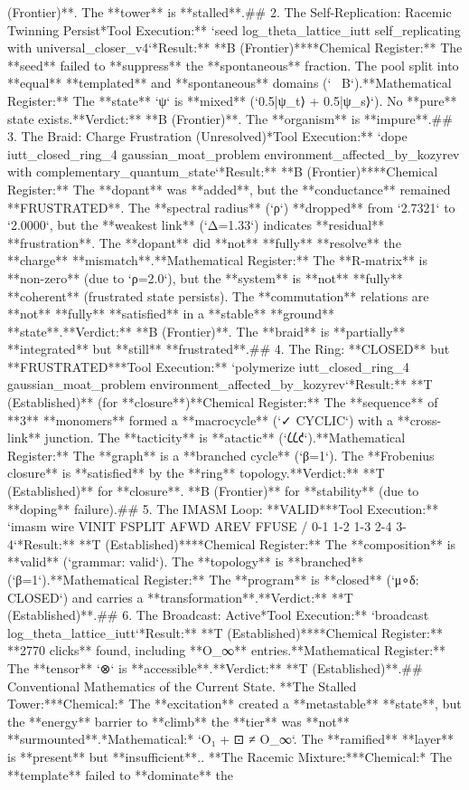 (Frontier)**. The **tower** is **stalled**.\n\n## 2. The Self-Replication: Racemic Twinning Persist\n**Tool Execution:** `seed log_theta_lattice_iutt self_replicating with universal_closer_v4`\n**Result:** **B (Frontier)**\n*   **Chemical Register:** The **seed** failed to **suppress** the **spontaneous** fraction. The pool split into **equal** **templated** and **spontaneous** domains (`~ B`).\n*   **Mathematical Register:** The **state** `ψ` is **mixed** (`0.5|ψ_t⟩ + 0.5|ψ_s⟩`). No **pure** state exists.\n*   **Verdict:** **B (Frontier)**. The **organism** is **impure**.\n\n## 3. The Braid: Charge Frustration (Unresolved)\n**Tool Execution:** `dope iutt_closed_ring_4 gaussian_moat_problem environment_affected_by_kozyrev with complementary_quantum_state`\n**Result:** **B (Frontier)**\n*   **Chemical Register:** The **dopant** was **added**, but the **conductance** remained **FRUSTRATED**. The **spectral radius** (`ρ`) **dropped** from `2.7321` to `2.0000`, but the **weakest link** (`Δ=1.33`) indicates **residual** **frustration**. The **dopant** did **not** **fully** **resolve** the **charge** **mismatch**.\n*   **Mathematical Register:** The **R-matrix** is **non-zero** (due to `ρ=2.0`), but the **system** is **not** **fully** **coherent** (frustrated state persists). The **commutation** relations are **not** **fully** **satisfied** in a **stable** **ground** **state**.\n*   **Verdict:** **B (Frontier)**. The **braid** is **partially** **integrated** but **still** **frustrated**.\n\n## 4. The Ring: **CLOSED** but **FRUSTRATED**\n**Tool Execution:** `polymerize iutt_closed_ring_4 gaussian_moat_problem environment_affected_by_kozyrev`\n**Result:** **T (Established)** (for **closure**)\n*   **Chemical Register:** The **sequence** of **3** **monomers** formed a **macrocycle** (`✓ CYCLIC`) with a **cross-link** junction. The **tacticity** is **atactic** (`𐑖𐑖𐑒`).\n*   **Mathematical Register:** The **graph** is a **branched cycle** (`β=1`). The **Frobenius closure** is **satisfied** by the **ring** topology.\n*   **Verdict:** **T (Established)** for **closure**. **B (Frontier)** for **stability** (due to **doping** failure).\n\n## 5. The IMASM Loop: **VALID**\n**Tool Execution:** `imasm wire VINIT FSPLIT AFWD AREV FFUSE / 0-1 1-2 1-3 2-4 3-4`\n**Result:** **T (Established)**\n*   **Chemical Register:** The **composition** is **valid** (`grammar: valid`). The **topology** is **branched** (`β=1`).\n*   **Mathematical Register:** The **program** is **closed** (`μ∘δ: CLOSED`) and carries a **transformation**.\n*   **Verdict:** **T (Established)**.\n\n## 6. The Broadcast: Active\n**Tool Execution:** `broadcast log_theta_lattice_iutt`\n**Result:** **T (Established)**\n*   **Chemical Register:** **2770 clicks** found, including **O_∞** entries.\n*   **Mathematical Register:** The **tensor** `⊗` is **accessible**.\n*   **Verdict:** **T (Established)**.\n\n## Conventional Mathematics of the Current State\n{}.  **The Stalled Tower:**\n    *   *Chemical:* The **excitation** created a **metastable** **state**, but the **energy** barrier to **climb** the **tier** was **not** **surmounted**.\n    *   *Mathematical:* `O₁ + ⊡ ≠ O_∞`. The **ramified** **layer** is **present** but **insufficient**.\n{}.  **The Racemic Mixture:**\n    *   *Chemical:* The **template** failed to **dominate** the 